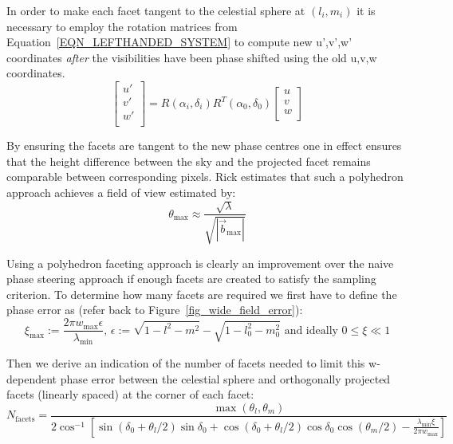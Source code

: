 In order to make each facet tangent to the celestial sphere at $(l_i,m_i)$ it is necessary to employ the rotation matrices from Equation~\ref{EQN_LEFTHANDED_SYSTEM}
to compute new u',v',w' coordinates \emph{after} the visibilities have been phase shifted using the old u,v,w coordinates.
\begin{equation}
 \left[\begin{array}{c}
	u'\\
	v'\\
	w'\\
       \end{array} \right] = R(\alpha_i,\delta_i)R^{T}(\alpha_0,\delta_0)\left[\begin{array}{c}
										u\\
										v \\
										w \\
									      \end{array}
									\right]
\end{equation}

By ensuring the facets are tangent to the new phase centres one in effect ensures that the height difference between the sky and the projected facet remains
comparable between corresponding pixels. Rick estimates that such a polyhedron approach achieves a field of view estimated by:
\begin{equation}
 \theta_{\text{max}} \approx \frac{\sqrt{\lambda}}{\sqrt{|\vec{b}_{\text{max}}|}}
\end{equation}

Using a polyhedron faceting approach is clearly an improvement over the naive phase steering approach if enough facets are created to satisfy the sampling 
criterion. To determine how many facets are required we first have to define the phase error as (refer back to Figure~\ref{fig_wide_field_error}):
\begin{equation}
\label{eqn_phase_error}
\xi_{\text{max}}:=\frac{2{\pi}w_{\text{max}}\epsilon}{{\lambda_{\text{min}}}} \text{, }\epsilon:=\sqrt{1-l^2-m^2} - \sqrt{1-l_0^2-m_0^2} \text{ and ideally } 0{\leq\xi\ll}1
\end{equation}

Then we derive an indication of the number of facets needed to limit this w-dependent phase error between the celestial sphere and orthogonally projected 
facets (linearly spaced) at the corner of each facet:
\begin{equation}
N_{\text{facets}} = \frac{\max{(\theta_l,\theta_m)}}{2\cos^{-1}{\left[\sin{(\delta_0 + \theta_l/2)}\sin{\delta_0} + \cos{(\delta_0 + \theta_l/2)}\cos{\delta_0}\cos{(\theta_m/2)}-\frac{\lambda_{\text{min}}\xi}{2{\pi}w_{\text{max}}}\right]}}
\end{equation}

